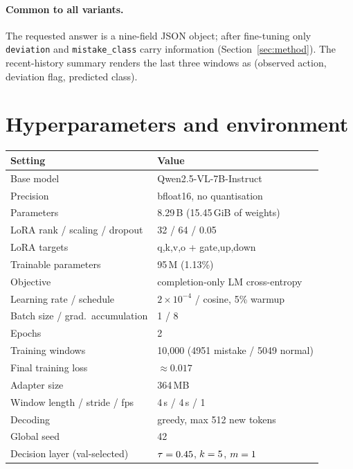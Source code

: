 \documentclass[10pt,twocolumn]{article}
\begin{document}
\paragraph{Common to all variants.} The requested answer is a nine-field JSON
object; after fine-tuning only \texttt{deviation} and \texttt{mistake\_class}
carry information (Section~\ref{sec:method}). The recent-history summary renders
the last three windows as (observed action, deviation flag, predicted class).

\section{Hyperparameters and environment}
\label{app:hyper}

\begin{center}
\footnotesize
\begin{tabular}{@{}l@{\hspace{5pt}}p{}@{}}
\toprule
Setting & Value \\
\midrule
Base model & Qwen2.5-VL-7B-Instruct \\
Precision & bfloat16, no quantisation \\
Parameters & 8.29\,B (15.45\,GiB of weights) \\
LoRA rank / scaling / dropout & 32 / 64 / 0.05 \\
LoRA targets & q,k,v,o + gate,up,down \\
Trainable parameters & 95\,M (1.13\%) \\
Objective & completion-only LM cross-entropy \\
Learning rate / schedule & $2\times10^{-4}$ / cosine, 5\% warmup \\
Batch size / grad.\ accumulation & 1 / 8 \\
Epochs & 2 \\
Training windows & 10{,}000 (4951 mistake / 5049 normal) \\
Final training loss & $\approx 0.017$ \\
Adapter size & 364\,MB \\
\midrule
Window length / stride / fps & 4\,s / 4\,s / 1 \\
Decoding & greedy, max 512 new tokens \\
Global seed & 42 \\
Decision layer (val-selected) & $\tau=0.45$, $k=5$, $m=1$ \\

\end{tabular}
\end{center}
\end{document}
